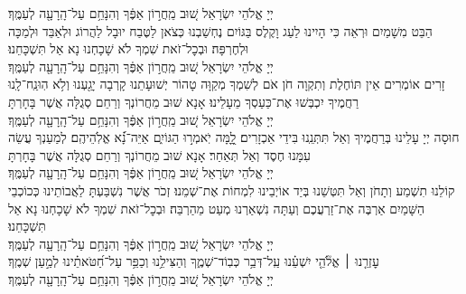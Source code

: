 \documentclass[twoside, openany, parskip=half, 11pt]{book}
\begin{document}
\nefilasapayim \label{nefilas_apayim}

\begin{sometimes}

\setlength{\LTpost}{0pt}

יְיָ אֱלֹהֵי יִשְׂרָאֵל  שׁ֚וּב מֵֽחֲר֣וֹן אַפֶּ֔ךָ וְהִנָּחֵ֥ם עַל־הָֽרָעָ֖ה לְעַמֶּֽךָ׃\\
הַבֵּט מִשָׁמַיִם וּרְאֵה כִּי הָיִינוּ לַעַג וָקֶלֶס בַּגּוֹיִם נֶחְשַׁבְנוּ כְּצֹאן לַטֶּבַח יוּבָל לַהֲרוֹג וּלְאַבֵּד וּלְמַכָּה וּלְחֶרְפָּה׃ וּבְכׇל־זֹאת שִׁמְךָ לֹא שָׁכָחְנוּ נָא אַל תִּשְׁכָּחֵנוּ׃\\
יְיָ אֱלֹהֵי יִשְׂרָאֵל שׁ֚וּב מֵֽחֲר֣וֹן אַפֶּ֔ךָ וְהִנָּחֵ֥ם עַל־הָֽרָעָ֖ה לְעַמֶּֽךָ׃\\
זָרִים אוֹמְרִים אֵין תּוֹחֶלֶת וְתִקְוָה חֹן אֹם לְשִׁמְךָ מְקַוָּה טָהוֹר יְשׁוּעָתֵנוּ קָרְבָה יָגַ֖עְנוּ וְלֹ֥א הֽוּנַֽח־לָֽנוּ רַחֲמֶיךָ יִכְבְּשׁוּ אֶת־כַּעַסְךָ מֵעָלֵינוּ׃ אָנָא שׁוּב מֵחֲרוֹנְךָ וְרַחֵם סְגֻלָּה אֲשֶׁר בָּחָרְתָּ\\
יְיָ אֱלֹהֵי יִשְׂרָאֵל שׁ֚וּב מֵֽחֲר֣וֹן אַפֶּ֔ךָ וְהִנָּחֵ֥ם עַל־הָֽרָעָ֖ה לְעַמֶּֽךָ׃\\
חוּסָה יְיָ עָלֵינוּ בְּרַחֲמֶיךָ וְאַל תִּתְּנֵֽנוּ בִּידֵי אַכְזָרִים׃
לׇׇ֭מָּה יֹֽאמְר֣וּ הַגּוֹיִ֑ם אַיֵּה־נָ֝֗א אֱלֹֽהֵיהֶֽם׃
לְמַעַנְךָ עֲשֵׂה עִמָּנוּ חֶסֶד וְאַל תְּאַחַר׃
אָנָא שׁוּב מֵחֲרוֹנְךָ וְרַחֵם סְגֻלָּה אֲשֶׁר בָּחָרְתָּ\\
יְיָ אֱלֹהֵי יִשְׂרָאֵל שׁ֚וּב מֵֽחֲר֣וֹן אַפֶּ֔ךָ וְהִנָּחֵ֥ם עַל־הָֽרָעָ֖ה לְעַמֶּֽךָ׃\\
קוֹלֵנוּ תִשְׁמַע וְתָחֹן וְאַל תִּטְּשֵׁנוּ בְּיַד אוֹיְבֵינוּ לִמְחוֹת אֶת־שְׁמֵנוּ׃
זְכֹר אֲשֶׁר נִשְׁבַּעְתָּ לַאֲבוֹתֵינוּ כְּכוֹכְבֵי הַשָּׁמַיִם אַרְבֶּה אֶת־זַרְעֲכֶם וְעַתָּה נִשְׁאַרְנוּ מְעַט מֵהַרְבֵּה׃
וּבְכׇל־זֹאת שִׁמְךָ לֹא שָׁכָחְנוּ נָא אַל תִּשְׁכָּחֵנוּ׃\\
יְיָ אֱלֹהֵי יִשְׂרָאֵל שׁ֚וּב מֵֽחֲר֣וֹן אַפֶּ֔ךָ וְהִנָּחֵ֥ם עַל־הָֽרָעָ֖ה לְעַמֶּֽךָ׃\\
עׇזְרֵ֤נוּ ׀ אֱלֹ֘הֵ֤י יִשְׁעֵ֗נוּ עַֽל־דְּבַ֥ר כְּבֽוֹד־שְׁמֶ֑ךָ וְהַצִּילֵ֥נוּ וְכַפֵּ֥ר עַל־חַ֝טֹּאתֵ֗ינוּ לְמַ֣עַן שְׁמֶֽךָ׃\\
יְיָ אֱלֹהֵי יִשְׂרָאֵל שׁ֚וּב מֵֽחֲר֣וֹן אַפֶּ֔ךָ וְהִנָּחֵ֥ם עַל־הָֽרָעָ֖ה לְעַמֶּֽךָ׃\\


\end{sometimes}
\end{document}
